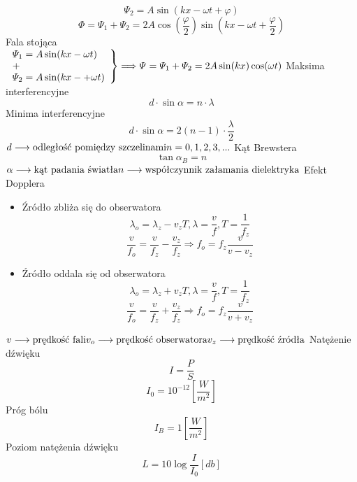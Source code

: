 \documentclass{article}
\begin{document}
\begin{enumerate}
\[		\varPsi_2 = A \sin (kx - \omega t + \varphi)
		\]
		\[
		\varPhi = \varPsi_1 + \varPsi_2 = 2A \cos \left( \frac{\varphi}{2} \right) \sin \left( kx - \omega t + \frac{\varphi}{2} \right)
		\]
		Fala stojąca \\
		$\left.
		\begin{array}{lll}
			\varPsi_1 = A \sin(kx - \omega t) \\
			+ \\
			\varPsi_2 = A \sin(kx -+\omega t)
		\end{array} 
		\right\} \Longrightarrow \varPsi = \varPsi_1 + \varPsi_2 = 2A \sin (kx) \cos (\omega t) \\ \\
		$
		Maksima interferencyjne
		\[
		d \cdot \sin \alpha = n \cdot \lambda
		\]
		Minima interferencyjne
		\[
		d \cdot \sin \alpha = 2(n - 1) \cdot \frac{\lambda}{2}
		\]
		$
		d \longrightarrow \text{odległość pomiędzy szczelinami} \\
		n = 0, 1, 2, 3, ... \\ \\
		$
		Kąt Brewstera
		\[
		\tan \alpha_B = n
		\]
		$
		\alpha \longrightarrow \text{kąt padania światła} \\
		n \longrightarrow \text{współczynnik załamania dielektryka} \\ \\
		$
		Efekt Dopplera
		\begin{itemize}
			\item Źródło zbliża się do obserwatora
			\[
			\lambda_o = \lambda_z - v_zT, \lambda = \frac{v}{f}, T = \frac{1}{f_z}
			\]
			\[
			\frac{v}{f_o} = \frac{v}{f_z} - \frac{v_z}{f_z} \Rightarrow f_o = f_z \frac{v}{v - v_z}
			\]
			\item Źródło oddala się od obserwatora
			\[
			\lambda_o = \lambda_z + v_zT, \lambda = \frac{v}{f}, T = \frac{1}{f_z}
			\]
			\[
			\frac{v}{f_o} = \frac{v}{f_z} + \frac{v_z}{f_z} \Rightarrow f_o = f_z \frac{v}{v + v_z}
			\]
		\end{itemize}
		$
		v \longrightarrow \text{prędkość fali} \\
		v_o \longrightarrow \text{prędkość obserwatora} \\
		v_z \longrightarrow \text{prędkość źródła}
		$
		\newpage
		Natężenie dźwięku
		\[
		I = \frac{P}{S}
		\]
		\[
		I_0 = 10^{-12} \left[ \frac{W}{m^2} \right]
		\]
		Próg bólu
		\[
		I_B = 1 \left[ \frac{W}{m^2} \right]
		\]
		Poziom natężenia dźwięku
		\[
		L = 10 \log \frac{I}{I_0} [db]
		\]
	
	\end{enumerate}
	
\end{document}
